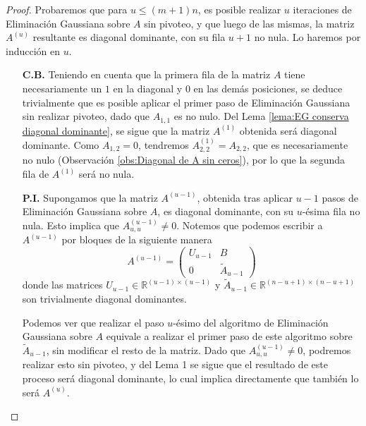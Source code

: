       \begin{proof}
        Probaremos que para $u \leq (m+1)n$, es posible realizar $u$ iteraciones de Eliminación Gaussiana sobre $A$ sin pivoteo, y que luego de las mismas, la matriz $A^{(u)}$ resultante es diagonal dominante, con su fila $u + 1$ no nula. Lo haremos por inducción en $u$.

          \begin{itemize}
            \item[\textbf{C.B.}] Teniendo en cuenta que la primera fila de la matriz $A$ tiene necesariamente un $1$ en la diagonal y $0$ en las demás posiciones, se deduce trivialmente que es posible aplicar el primer paso de Eliminación Gaussiana sin realizar pivoteo, dado que $A_{1, 1}$ es no nulo. Del Lema \ref{lema:EG conserva diagonal dominante}, se sigue que la matriz $A^{(1)}$ obtenida será diagonal dominante. Como $A_{1, 2} = 0$, tendremos $A^{(1)}_{2,2} = A_{2,2}$, que es necesariamente no nulo (Observación \ref{obs:Diagonal de A sin ceros}), por lo que la segunda fila de $A^{(1)}$ será no nula.
                
            \item[\textbf{P.I.}] Supongamos que la matriz $A^{(u - 1)}$, obtenida tras aplicar $u - 1$ pasos de Eliminación Gaussiana sobre $A$, es diagonal dominante, con su $u$-ésima fila no nula. Esto implica que $A^{(u - 1)}_{u,u} \neq 0$. Notemos que podemos escribir a $A^{(u - 1)}$ por bloques de la siguiente manera
              \[ A^{(u - 1)} = \left( \begin{matrix} U_{u - 1} & B \\ 0 & \widetilde{A}_{u - 1} \end{matrix} \right) \]
            donde las matrices $U_{u - 1} \in \mathbb{R}^{(u-1)\times(u-1)}$ y $\widetilde{A}_{u - 1} \in \mathbb{R}^{(n-u+1)\times(n-u+1)}$ son trivialmente diagonal dominantes.

            Podemos ver que realizar el paso $u$-ésimo del algoritmo de Eliminación Gaussiana sobre $A$ equivale a realizar el primer paso de este algoritmo sobre $\widetilde{A}_{u - 1}$, sin modificar el resto de la matriz. Dado que $A^{(u - 1)}_{u,u} \neq 0$, podremos realizar esto sin pivoteo, y del Lema 1 se sigue que el resultado de este proceso será diagonal dominante, lo cual implica directamente que también lo será $A^{(u)}$.


\end{itemize}
\end{proof}
